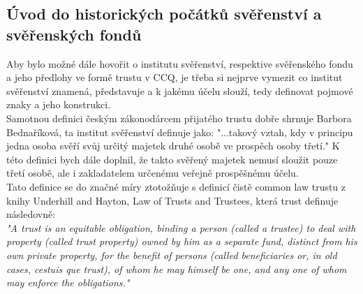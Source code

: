 \documentclass{article}
\begin{document}
\newpage

\subsection{Úvod do historických počátků svěřenství a svěřenských fondů}

\indent Aby bylo možné dále hovořit o institutu svěřenství, respektive svěřenského fondu a jeho předlohy ve formě trustu v CCQ, je třeba si nejprve vymezit co institut svěřenství znamená, představuje a k jakému účelu slouží, tedy definovat pojmové znaky a jeho konstrukci.\\

Samotnou definici českým zákonodárcem přijatého trustu dobře shrnuje Bar\-bora Bednaříková, ta institut svěřenství definuje jako: "...takový vztah, kdy v principu jedna osoba svěří svůj určitý majetek druhé osobě ve prospěch osoby třetí." K této definici bych dále doplnil, že takto svěřený majetek nemusí sloužit pouze třetí osobě, ale i zakladatelem určenému veřejně prospěšnému účelu.\\

Tato definice se do značné míry ztotožňuje s definicí čistě common law trustu z knihy Underhill and Hayton, Law of Trusts and Trustees, která trust definuje následovně:\\ 


\textit{"A trust is an equitable obligation, binding a person (called a trustee) to deal with property (called trust property) owned by him as a separate fund, distinct from his own private property, for the benefit of persons (called beneficiaries or, in old cases, cestuis que trust), of whom he may himself be one, and any one of whom may enforce the obligations."} \\

\end{document}
